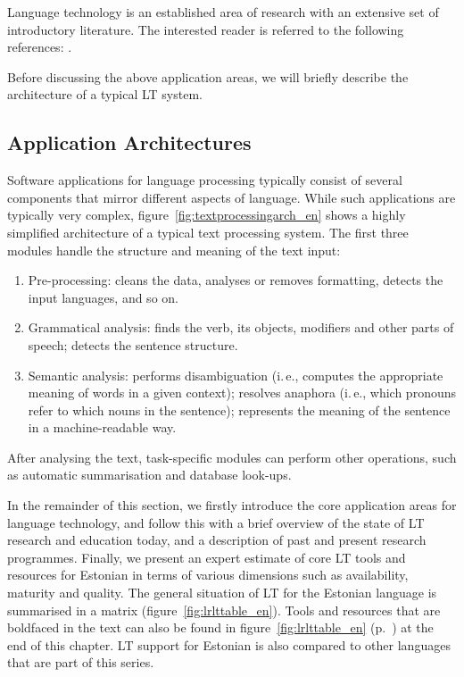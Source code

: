 \begin{multicols}{2}
Language technology is an established area of research with an extensive set of introductory literature. The interested reader is referred to the following references:  \cite{carstensen-etal1, jurafsky-martin01, manning-schuetze1, lt-world1, lt-survey1}.

Before discussing the above application areas, we will briefly describe the architecture of a typical LT system.

\subsection{Application Architectures}

Software applications for language processing typically consist of several components that mirror different aspects of language. While such applications are typically very complex, figure~\ref{fig:textprocessingarch_en} shows a highly simplified architecture of a typical text processing system. The first three modules handle the structure and meaning of the text input:

\begin{enumerate}
\item Pre-processing: cleans the data, analyses or removes formatting, detects the input languages, and so on.
\item Grammatical analysis: finds the verb, its objects, modifiers and other parts of speech; detects the sentence structure.
\item Semantic analysis: performs disambiguation (i.\,e., computes the appropriate meaning of words in a given context); resolves anaphora (i.\,e., which pronouns refer to which nouns in the sentence); represents the meaning of the sentence in a machine-readable way.
\end{enumerate}

After analysing the text, task-specific modules can perform other operations, such as automatic summarisation and database look-ups.

In the remainder of this section, we firstly introduce the core application areas for language technology, and follow this with a brief overview of the state of LT research and education today, and a description of past and present research programmes. Finally, we present an expert estimate of core LT tools and resources for Estonian in terms of various dimensions such as availability, maturity and quality. The general situation of LT for the Estonian language is summarised in a matrix (figure~\ref{fig:lrlttable_en}). Tools and resources that are boldfaced in the text can also be found in figure~\ref{fig:lrlttable_en} (p.~\pageref{fig:lrlttable_en}) at the end of this chapter. LT support for Estonian is also compared to other languages that are part of this series.


\end{multicols}
